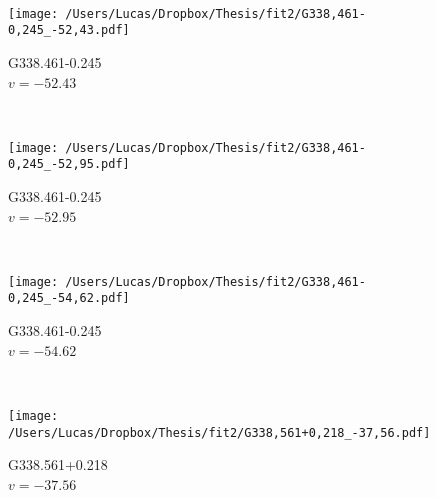\begin{figure*}[t]
\begin{subfigure}[t]{0.3\textwidth}
	\end{subfigure}
	~
	\begin{subfigure}[t]{0.3\textwidth}
		\texttt{[image: /Users/Lucas/Dropbox/Thesis/fit2/G338,461-0,245\_-52,43.pdf]}
		\caption[]{G338.461-0.245\\$v=-52.43$\,\kms}
	\end{subfigure}
	~
	\begin{subfigure}[t]{0.3\textwidth}
		\texttt{[image: /Users/Lucas/Dropbox/Thesis/fit2/G338,461-0,245\_-52,95.pdf]}
		\caption[]{G338.461-0.245\\$v=-52.95$\,\kms}
	\end{subfigure}
	~
	\begin{subfigure}[t]{0.3\textwidth}
		\texttt{[image: /Users/Lucas/Dropbox/Thesis/fit2/G338,461-0,245\_-54,62.pdf]}
		\caption[]{G338.461-0.245\\$v=-54.62$\,\kms}
	\end{subfigure}
	~
	\begin{subfigure}[t]{0.3\textwidth}
		\texttt{[image: /Users/Lucas/Dropbox/Thesis/fit2/G338,561+0,218\_-37,56.pdf]}
		\caption[]{G338.561+0.218\\$v=-37.56$\,\kms}
	\end{subfigure}
	~
\end{figure*}
\clearpage
